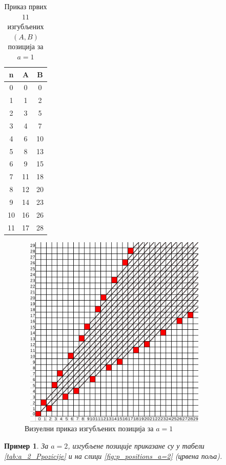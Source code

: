 \documentclass[a4paper]{article}
\newtheorem{example}{Пример}
\begin{document}
\begin{table}[h!]
	\caption{Приказ првих $ 11 $ изгубљених $ (A, B) $ позиција за $ a = 1 $}
	\label{tab:a_1_Ppozicije}
	\begin{center}
		\begin{tabular}{  c | c | c }
			{\textbf{n}} &  {\textbf{A}} &  {\textbf{B}} \\
			\hline
			0 & 0 & 0 \\
			1 & 1 & 2 \\
			2 & 3 & 5 \\
			3 & 4 & 7 \\
			4 & 6 & 10 \\
			5 & 8 & 13 \\
			6 & 9 & 15 \\
			7 & 11 & 18 \\
			8 & 12 & 20 \\
			9 & 14 & 23 \\
			10 & 16 & 26\\
			11 & 17 & 28\\ 
		\end{tabular}
	\end{center}
\end{table}

\begin{figure}[H]
	\begin{center}
		\includegraphics[width=350px, height=350px]{p_positions_a=1.png}
	\end{center}
	\caption{Визуелни приказ изгубљених позиција за $ a = 1 $}
	\label{fig:p_positions_a=1}
\end{figure}

\begin{example}
	За $ a = 2 $, изгубљене позиције приказане су у табели \ref{tab:a_2_Ppozicije} и на слици \ref{fig:p_positions_a=2} (црвена поља).
\end{example}
\end{document}
